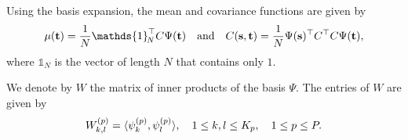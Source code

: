 Using the basis expansion, the mean and covariance functions are given by
\begin{equation}
    \mu(\pointt) = \frac{1}{N}\mathds{1}_{\!N}^\top C\Psi(\pointt) \quad\text{and}\quad C(\points, \pointt) = \frac{1}{N}\Psi(\points)^\top C^\top C \Psi(\pointt),
\end{equation}
where $\mathds{1}_{\!N}$ is the vector of length $N$ that contains only $1$.

We denote by $W$ the matrix of inner products of the basis $\Psi$. The entries of $W$ are given by
\begin{equation}
    W_{k, l}^{(p)} = \langle\psi_k^{(p)}, \psi_l^{(p)}\rangle, \quad 1 \leq k, l \leq K_p, \quad 1 \leq p \leq P.
\end{equation}

